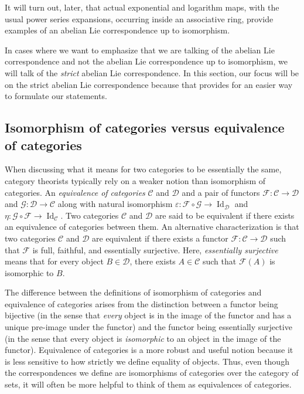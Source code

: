 It will turn out, later, that actual exponential and logarithm maps,
with the usual power series expansions, occurring inside an
associative ring, provide examples of an abelian Lie correspondence up
to isomorphism.

In cases where we want to emphasize that we are talking of the abelian
Lie correspondence and not the abelian Lie correspondence up to
isomorphism, we will talk of the {\em strict} abelian Lie
correspondence. In this section, our focus will be on the strict
abelian Lie correspondence because that provides for an easier way to
formulate our statements.

\subsection{Isomorphism of categories versus equivalence of categories}

When discussing what it means for two categories to be essentially the
same, category theorists typically rely on a weaker notion than
isomorphism of categories. An {\em equivalence of categories}
$\mathcal{C}$ and $\mathcal{D}$ and a pair of functors $\mathcal{F}:\mathcal{C}
\to \mathcal{D}$ and $\mathcal{G}:\mathcal{D} \to \mathcal{C}$ along with
natural isomorphism $\varepsilon:\mathcal{F} \circ \mathcal{G} \to
\operatorname{Id}_{\mathcal{D}}$ and $\eta:\mathcal{G} \circ \mathcal{F} \to
\operatorname{Id}_{\mathcal{C}}$. Two categories $\mathcal{C}$ and
$\mathcal{D}$ are said to be equivalent if there exists an equivalence
of categories between them. An alternative characterization is that
two categories $\mathcal{C}$ and $\mathcal{D}$ are equivalent if there
exists a functor $\mathcal{F}: \mathcal{C} \to \mathcal{D}$ such that $\mathcal{F}$ is
full, faithful, and essentially surjective. Here, {\em essentially
  surjective} means that for every object $B \in \mathcal{D}$, there
exists $A \in \mathcal{C}$ such that $\mathcal{F}(A)$ is isomorphic to $B$.

The difference between the definitions of isomorphism of categories
and equivalence of categories arises from the distinction between a
functor being bijective (in the sense that {\em every} object is in
the image of the functor and has a unique pre-image under the functor)
and the functor being essentially surjective (in the sense that every
object is {\em isomorphic} to an object in the image of the
functor). Equivalence of categories is a more robust and useful notion
because it is less sensitive to how strictly we define equality of
objects. Thus, even though the correspondences we define are
isomorphisms of categories over the category of sets, it will often be
more helpful to think of them as equivalences of categories.

